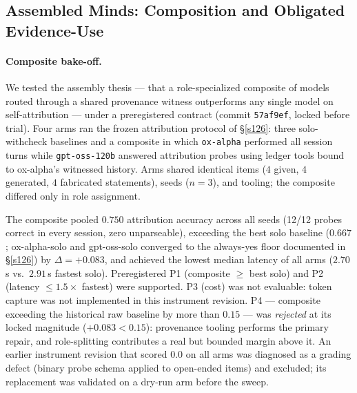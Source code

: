 
\subsection{Assembled Minds: Composition and Obligated Evidence-Use}
\label{subsec:composite_anchoring}

\paragraph{Composite bake-off.}
We tested the assembly thesis --- that a role-specialized composite of
models routed through a shared provenance witness outperforms any single
model on self-attribution --- under a preregistered contract
(commit \texttt{57af9ef}, locked before trial). Four arms ran the
frozen attribution protocol of \S\ref{s126}: three solo-withcheck
baselines and a composite in which \texttt{ox-alpha} performed all
session turns while \texttt{gpt-oss-120b} answered attribution probes
using ledger tools bound to ox-alpha's witnessed history. Arms shared
identical items ($4$ given, $4$ generated, $4$ fabricated statements),
seeds ($n{=}3$), and tooling; the composite differed only in role
assignment.

The composite pooled $0.750$ attribution accuracy across all seeds
(12/12 probes correct in every session, zero unparseable), exceeding
the best solo baseline ($0.667$; ox-alpha-solo and gpt-oss-solo
converged to the always-yes floor documented in \S\ref{s126}) by
$\Delta = +0.083$, and achieved the lowest median latency of all arms
($2.70$\,s vs.\ $2.91$\,s fastest solo). Preregistered P1
(composite $\geq$ best solo) and P2 (latency $\leq 1.5\times$ fastest)
were supported. P3 (cost) was not evaluable: token capture was not
implemented in this instrument revision. P4 --- composite exceeding the
historical raw baseline by more than $0.15$ --- was \emph{rejected} at
its locked magnitude ($+0.083 < 0.15$): provenance tooling performs the
primary repair, and role-splitting contributes a real but bounded
margin above it. An earlier instrument revision that scored $0.0$ on
all arms was diagnosed as a grading defect (binary probe schema applied
to open-ended items) and excluded; its replacement was validated on a
dry-run arm before the sweep.

